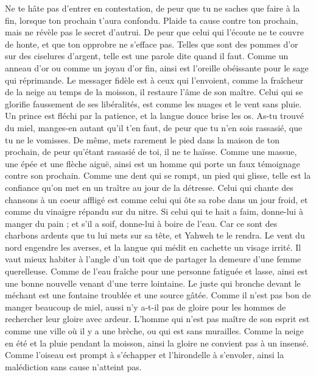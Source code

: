 \begin{multicols}{2}
Ne te hâte pas d’entrer en contestation, de peur que tu ne saches que faire à la fin, lorsque ton prochain t'aura confondu.
Plaide ta cause contre ton prochain, mais ne révèle pas le secret d'autrui.
De peur que celui qui l'écoute ne te couvre de honte, et que ton opprobre ne s'efface pas.
Telles que sont des pommes d'or sur des ciselures d'argent, telle est une parole dite quand il faut.
Comme un anneau d'or ou comme un joyau d’or fin, ainsi est l’oreille obéissante pour le sage qui réprimande.
Le messager fidèle est à ceux qui l'envoient, comme la fraîcheur de la neige au temps de la moisson, il restaure l'âme de son maître.
Celui qui se glorifie faussement de ses libéralités, est comme les nuages et le vent sans pluie.
Un prince est fléchi par la patience, et la langue douce brise les os.
As-tu trouvé du miel, manges-en autant qu'il t’en faut, de peur que tu n'en sois rassasié, que tu ne le vomisses.
De même, mets rarement le pied dans la maison de ton prochain, de peur qu'étant rassasié de toi, il ne te haïsse.
Comme une massue, une épée et une flèche aiguë, ainsi est un homme qui porte un faux témoignage contre son prochain.
Comme une dent qui se rompt, un pied qui glisse, telle est la confiance qu'on met en un traître au jour de la détresse.
Celui qui chante des chansons à un coeur affligé est comme celui qui ôte sa robe dans un jour froid, et comme du vinaigre répandu sur du nitre.
Si celui qui te hait a faim, donne-lui à manger du pain ; et s'il a soif, donne-lui à boire de l'eau.
Car ce sont des charbons ardents que tu lui mets sur sa tête, et Yahweh te le rendra.
Le vent du nord engendre les averses, et la langue qui médit en cachette un visage irrité.
Il vaut mieux habiter à l’angle d'un toit que de partager la demeure d’une femme querelleuse.
Comme de l'eau fraîche pour une personne fatiguée et lasse, ainsi est une bonne nouvelle venant d'une terre lointaine.
Le juste qui bronche devant le méchant est une fontaine troublée et une source gâtée.
Comme il n'est pas bon de manger beaucoup de miel, aussi n'y a-t-il pas de gloire pour les hommes de rechercher leur gloire avec ardeur.
L'homme qui n’est pas maître de son esprit est comme une ville où il y a une brèche, ou qui est sans murailles.
\VerseOne{}Comme la neige en été et la pluie pendant la moisson, ainsi la gloire ne convient pas à un insensé.
Comme l'oiseau est prompt à s’échapper et l'hirondelle à s’envoler, ainsi la malédiction sans cause n'atteint pas.

\end{multicols}
